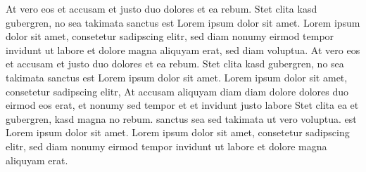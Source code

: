 %

At vero eos et accusam et justo duo dolores et ea rebum. Stet clita kasd gubergren, no sea takimata sanctus est Lorem ipsum dolor sit amet. Lorem ipsum dolor sit amet, consetetur sadipscing elitr, sed diam nonumy eirmod tempor invidunt ut labore et dolore magna aliquyam erat, sed diam voluptua. At vero eos et accusam et justo duo dolores et ea rebum. Stet clita kasd gubergren, no sea takimata sanctus est Lorem ipsum dolor sit amet. Lorem ipsum dolor sit amet, consetetur sadipscing elitr, At accusam aliquyam diam diam dolore dolores duo eirmod eos erat, et nonumy sed tempor et et invidunt justo labore Stet clita ea et gubergren, kasd magna no rebum. sanctus sea sed takimata ut vero voluptua. est Lorem ipsum dolor sit amet. Lorem ipsum dolor sit amet, consetetur sadipscing elitr, sed diam nonumy eirmod tempor invidunt ut labore et dolore magna aliquyam erat.

